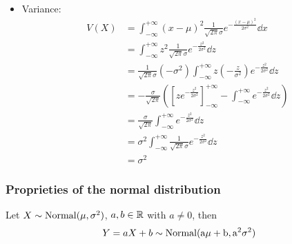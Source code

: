 \documentclass[12pt]{extarticle}
\begin{document}
\begin{itemize}
    \item Variance:
          \begin{align}
              V(X) & = \int_{-\infty}^{+\infty} (x - \mu)^2 \frac{1}{\sqrt{2\pi} \sigma} e^{-\frac{(x-\mu)^2}{2\sigma^2}} \dd{x}                                                               \\
                   & = \int_{-\infty}^{+\infty} z^2 \frac{1}{\sqrt{2\pi} \sigma} e^{-\frac{z^2}{2\sigma^2}} \dd{z}                                                                             \\
                   & = \frac{1}{\sqrt{2\pi} \sigma}(-\sigma^2) \int_{-\infty}^{+\infty} z \left(- \frac{z}{\sigma^2}\right) e^{-\frac{z^2}{2\sigma^2}} \dd{z}                                  \\
                   & = -\frac{\sigma}{\sqrt{2\pi}} \left( \left[ z e^{-\frac{z^2}{2\sigma^2}} \right]_{-\infty}^{+\infty} - \int_{-\infty}^{+\infty} e^{-\frac{z^2}{2\sigma^2}} \dd{z} \right) \\
                   & = \frac{\sigma}{\sqrt{2\pi}} \int_{-\infty}^{+\infty} e^{-\frac{z^2}{2\sigma^2}} \dd{z}                                                                                   \\
                   & = \sigma^2 \int_{-\infty}^{+\infty} \frac{1}{\sqrt{2\pi} \sigma} e^{-\frac{z^2}{2\sigma^2}} \dd{z}                                                                        \\
                   & = \sigma^2
          \end{align}
\end{itemize}

\subsubsection{Proprieties of the normal distribution}


\begin{theorem}
    Let $X \sim \operatorfont{Normal}(\mu, \sigma^2)$, $a, b \in \mathbb{R}$ with $a \neq 0$, then
    \begin{equation}
        Y = aX + b \sim \operatorfont{Normal}(a\mu + b, a^2 \sigma^2)
    \end{equation}
\end{theorem}
\end{document}

